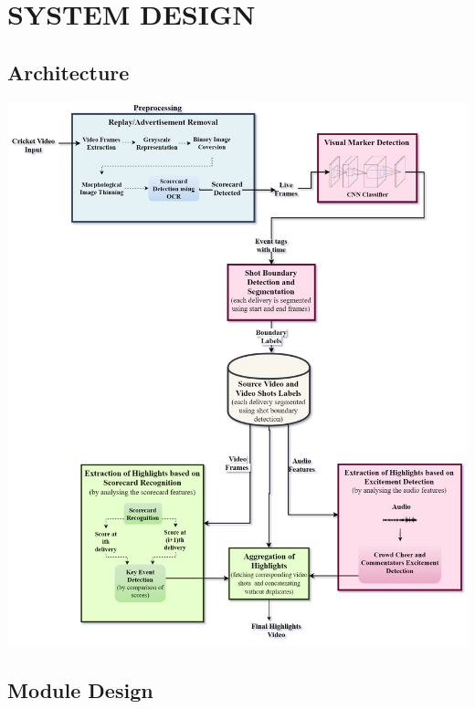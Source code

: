 
\chapter{SYSTEM DESIGN} %
\section{Architecture}
\includegraphics[width=1.0\textwidth,center]{Figures/SysArch.png}
\newpage
\section {Module Design}
